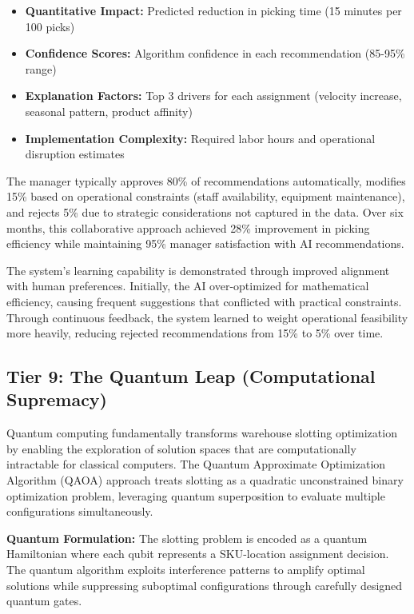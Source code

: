 \documentclass{article}
\begin{document}
\begin{itemize}
\item \textbf{Quantitative Impact:} Predicted reduction in picking time (15 minutes per 100 picks)
\item \textbf{Confidence Scores:} Algorithm confidence in each recommendation (85-95\% range)
\item \textbf{Explanation Factors:} Top 3 drivers for each assignment (velocity increase, seasonal pattern, product affinity)
\item \textbf{Implementation Complexity:} Required labor hours and operational disruption estimates
\end{itemize}

The manager typically approves 80\% of recommendations automatically, modifies 15\% based on operational constraints (staff availability, equipment maintenance), and rejects 5\% due to strategic considerations not captured in the data. Over six months, this collaborative approach achieved 28\% improvement in picking efficiency while maintaining 95\% manager satisfaction with AI recommendations.

The system's learning capability is demonstrated through improved alignment with human preferences. Initially, the AI over-optimized for mathematical efficiency, causing frequent suggestions that conflicted with practical constraints. Through continuous feedback, the system learned to weight operational feasibility more heavily, reducing rejected recommendations from 15\% to 5\% over time.

\subsection{Tier 9: The Quantum Leap (Computational Supremacy)}

Quantum computing fundamentally transforms warehouse slotting optimization by enabling the exploration of solution spaces that are computationally intractable for classical computers. The Quantum Approximate Optimization Algorithm (QAOA) approach treats slotting as a quadratic unconstrained binary optimization problem, leveraging quantum superposition to evaluate multiple configurations simultaneously.

\textbf{Quantum Formulation:} The slotting problem is encoded as a quantum Hamiltonian where each qubit represents a SKU-location assignment decision. The quantum algorithm exploits interference patterns to amplify optimal solutions while suppressing suboptimal configurations through carefully designed quantum gates.
\end{document}

